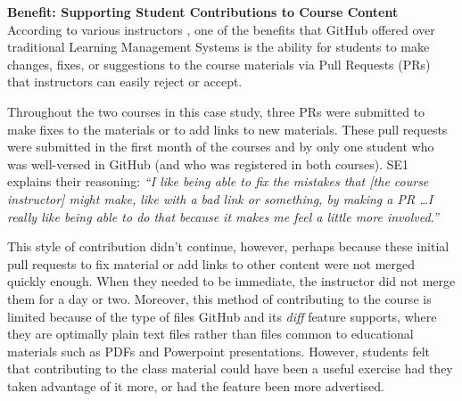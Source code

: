 



\textbf{Benefit: Supporting Student Contributions to Course Content} \\
According to various instructors \cite{zagalsky2015emergence}, one of the benefits that GitHub offered over traditional Learning Management Systems is the ability for students to make changes, fixes, or suggestions to the course materials via Pull Requests (PRs) that instructors can easily reject or accept.

Throughout the two courses in this case study, three PRs were submitted to make fixes to the materials or to add links to new materials. These pull requests were submitted in the first month of the courses and by only one student who was well-versed in GitHub (and who was registered in both courses). SE1 explains their reasoning: \textit{``I like being able to fix the mistakes that [the course instructor] might make, like with a bad link or something, by making a PR \ldots I really like being able to do that because it makes me feel a little more involved.''}

This style of contribution didn't continue, however, perhaps because these initial pull requests to fix material or add links to other content were not merged quickly enough. When they needed to be immediate, the instructor did not merge them for a day or two. Moreover, this method of contributing to the course is limited because of the type of files GitHub and its \emph{diff} feature supports, where they are optimally plain text files rather than files common to educational materials such as PDFs and Powerpoint presentations. However, students felt that contributing to the class material could have been a useful exercise had they taken advantage of it more, or had the feature been more advertised.

